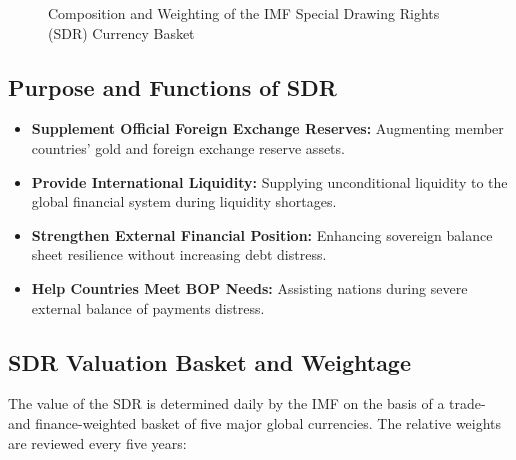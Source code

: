 \begin{figure}[htbp]
{%
    }
    \caption{Composition and Weighting of the IMF Special Drawing Rights (SDR) Currency Basket}
    \label{fig:sdr_basket}
\end{figure}

\subsection{Purpose and Functions of SDR}
\begin{itemize}[leftmargin=*]
    \item \textbf{Supplement Official Foreign Exchange Reserves:} Augmenting member countries' gold and foreign exchange reserve assets.
    \item \textbf{Provide International Liquidity:} Supplying unconditional liquidity to the global financial system during liquidity shortages.
    \item \textbf{Strengthen External Financial Position:} Enhancing sovereign balance sheet resilience without increasing debt distress.
    \item \textbf{Help Countries Meet BOP Needs:} Assisting nations during severe external balance of payments distress.
\end{itemize}

\subsection{SDR Valuation Basket and Weightage}
The value of the SDR is determined daily by the IMF on the basis of a trade- and finance-weighted basket of five major global currencies. The relative weights are reviewed every five years:

